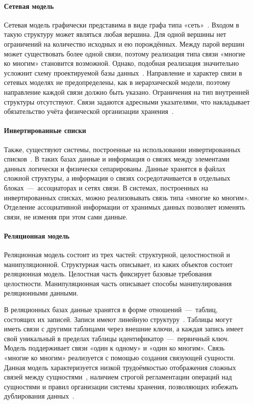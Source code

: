 \paragraph{Сетевая модель}\mbox{}

Сетевая модель графически представима в виде графа типа «сеть»~\cite{bib15}. Входом в такую структуру может являться любая вершина. Для одной вершины нет ограничений на количество исходных и ею порождённых. Между парой вершин может существовать более одной связи, поэтому реализация типа связи «многие ко многим» становится возможной. Однако, подобная реализация значительно усложнит схему проектируемой базы данных~\cite{bib20}. Направление и характер связи в сетевых моделях не предопределены, как в иерархической модели, поэтому направление каждой связи должно быть указано. Ограничения на тип внутренней структуры отсутствуют. Связи задаются адресными указателями, что накладывает обязательство учёта физической организации хранения~\cite{bib19}.

\paragraph{Инвертированные списки}\mbox{}

Также, существуют системы, построенные на использовании инвертированных списков~\cite{bib15}. В таких базах данные и информация о связях между элементами данных логически и физически сепарированы. Данные хранятся в файлах сложной структуры, а информация о связях сосредотачивается в отдельных блоках~---~ассоциаторах и сетях связи. В системах, построенных на инвертированных списках, можно реализовывать связь типа «многие ко многим». Отделение ассоциативной информации от хранимых данных позволяет изменять связи, не изменяя при этом сами данные.

\paragraph{Реляционная модель}\mbox{}

Реляционная модель состоит из трех частей: структурной, целостностной и манипуляционной. Структурная часть описывает, из каких объектов состоит реляционная модель. Целостная часть фиксирует базовые требования целостности. Манипуляционная часть описывает способы манипулирования реляционными данными. 

В реляционных базах данные хранятся в форме отношений~---~таблиц, состоящих их записей. Записи имеют линейную структуру~\cite{bib15}. Таблицы могут иметь связи с другими таблицами через внешние ключи, а каждая запись имеет свой уникальный в пределах таблицы идентификатор~---~первичный ключ. Модель поддерживает связи «один к одному» и «один ко многим». Связь «многие ко многим» реализуется с помощью создания связующей сущности. Данная модель характеризуется низкой трудоёмкостью отображения сложных связей между сущностями~\cite{bib19}, наличием строгой регламентации операций над сущностями и правил организации системы хранения, позволяющих избежать дублирования данных~\cite{bib20}.

